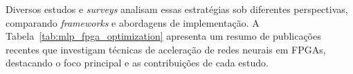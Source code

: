 %
%
%

Diversos estudos e \textit{surveys} analisam essas estratégias sob diferentes perspectivas, comparando \textit{frameworks} e abordagens de implementação. A Tabela~\ref{tab:mlp_fpga_optimization} apresenta um resumo de publicações recentes que investigam técnicas de aceleração de redes neurais em FPGAs, destacando o foco principal e as contribuições de cada estudo.

